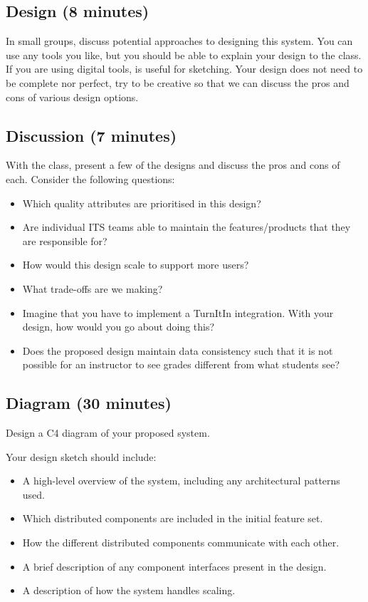 \documentclass{csse4400}
\begin{document}
\subsection*{Design (8 minutes)}
In small groups, discuss potential approaches to designing this system.
You can use any tools you like,
but you should be able to explain your design to the class.
If you are using digital tools,
 is useful for sketching.
Your design does not need to be complete nor perfect,
try to be creative so that we can discuss the pros and cons of various design options.


\subsection*{Discussion (7 minutes)}
With the class, present a few of the designs and discuss the pros and cons of each.
Consider the following questions:
\begin{itemize}
\item Which quality attributes are prioritised in this design?
\item Are individual ITS teams able to maintain the features/products that they are responsible for?
\item How would this design scale to support more users?
\item What trade-offs are we making?
\item Imagine that you have to implement a TurnItIn integration.
    With your design, how would you go about doing this?
\item Does the proposed design maintain data consistency such that it is not possible for an instructor to see grades different from what students see?
\end{itemize}

\subsection*{Diagram (30 minutes)}
Design a C4 diagram of your proposed system.

Your design sketch should include:
\begin{itemize}
\item A high-level overview of the system, including any architectural patterns used.
\item Which distributed components are included in the initial feature set.
\item How the different distributed components communicate with each other.
\item A brief description of any component interfaces present in the design.
\item A description of how the system handles scaling.
\end{itemize}
\end{document}
